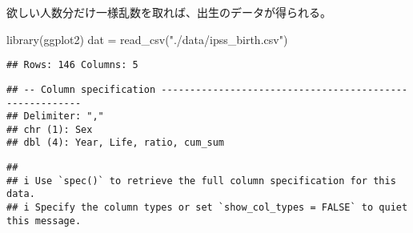 \documentclass[
]{book}
\newenvironment{Shaded}{\begin{snugshade}}{\end{snugshade}}
\newcommand{\FunctionTok}[1]{\textcolor[rgb]{0.00,0.00,0.00}{#1}}
\newcommand{\NormalTok}[1]{#1}
\newcommand{\OtherTok}[1]{\textcolor[rgb]{0.56,0.35,0.01}{#1}}
\newcommand{\StringTok}[1]{\textcolor[rgb]{0.31,0.60,0.02}{#1}}
\begin{document}
欲しい人数分だけ一様乱数を取れば、出生のデータが得られる。

\begin{Shaded}
\begin{Highlighting}[]
\FunctionTok{library}\NormalTok{(ggplot2)}
\NormalTok{dat }\OtherTok{=} \FunctionTok{read\_csv}\NormalTok{(}\StringTok{"./data/ipss\_birth.csv"}\NormalTok{)}
\end{Highlighting}
\end{Shaded}

\begin{verbatim}
## Rows: 146 Columns: 5
\end{verbatim}

\begin{verbatim}
## -- Column specification --------------------------------------------------------
## Delimiter: ","
## chr (1): Sex
## dbl (4): Year, Life, ratio, cum_sum
\end{verbatim}

\begin{verbatim}
## 
## i Use `spec()` to retrieve the full column specification for this data.
## i Specify the column types or set `show_col_types = FALSE` to quiet this message.
\end{verbatim}
\end{document}
